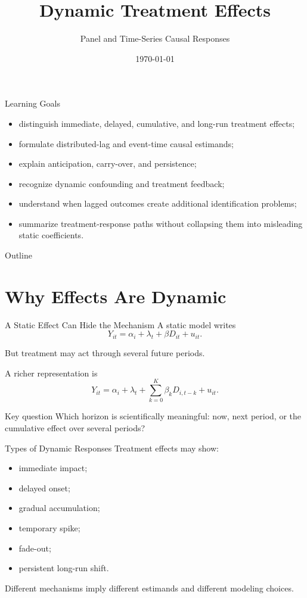 \documentclass[aspectratio=169,11pt]{beamer}
\title[Dynamic Treatment Effects]{Dynamic Treatment Effects}
\subtitle{Panel and Time-Series Causal Responses}
\date{\today}
\begin{document}
\begin{frame}
\titlepage
\end{frame}

\begin{frame}{Learning Goals}
\begin{itemize}
\item distinguish immediate, delayed, cumulative, and long-run treatment effects;
\item formulate distributed-lag and event-time causal estimands;
\item explain anticipation, carry-over, and persistence;
\item recognize dynamic confounding and treatment feedback;
\item understand when lagged outcomes create additional identification problems;
\item summarize treatment-response paths without collapsing them into misleading static coefficients.
\end{itemize}
\end{frame}

\begin{frame}{Outline}
\tableofcontents
\end{frame}

\section{Why Effects Are Dynamic}

\begin{frame}{A Static Effect Can Hide the Mechanism}
A static model writes
\[
Y_{it}=\alpha_i+\lambda_t+\beta D_{it}+u_{it}.
\]

But treatment may act through several future periods.

A richer representation is
\[
Y_{it}
=
\alpha_i+\lambda_t
+
\sum_{k=0}^{K}\beta_kD_{i,t-k}
+
u_{it}.
\]

\begin{alertblock}{Key question}
Which horizon is scientifically meaningful: now, next period, or the cumulative effect over several periods?
\end{alertblock}
\end{frame}

\begin{frame}{Types of Dynamic Responses}
Treatment effects may show:
\begin{itemize}
\item immediate impact;
\item delayed onset;
\item gradual accumulation;
\item temporary spike;
\item fade-out;
\item persistent long-run shift.
\end{itemize}

Different mechanisms imply different estimands and different modeling choices.
\end{frame}
\end{document}
